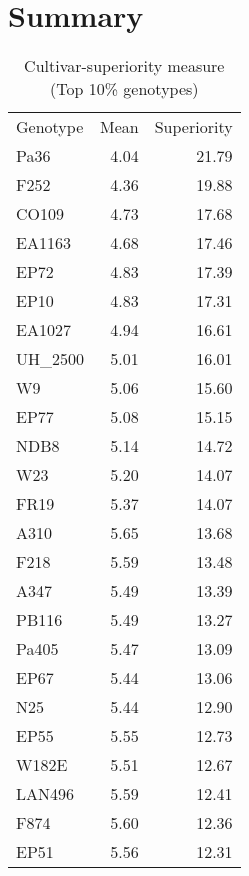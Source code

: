 \documentclass[a4paper,11pt]{article}\usepackage[]{graphicx}\usepackage[]{xcolor}
\begin{document}
\section{Summary}
\begin{table}[ht]
\begin{flushleft}
\caption{Cultivar-superiority measure (Top 10\% genotypes)} 
\label{cultSup}
\begin{tabular}{lrr}
 Genotype & Mean & Superiority \\ 
 Pa36 & 4.04 & 21.79 \\ 
  F252 & 4.36 & 19.88 \\ 
  CO109 & 4.73 & 17.68 \\ 
  EA1163 & 4.68 & 17.46 \\ 
  EP72 & 4.83 & 17.39 \\ 
  EP10 & 4.83 & 17.31 \\ 
  EA1027 & 4.94 & 16.61 \\ 
  UH\_2500 & 5.01 & 16.01 \\ 
  W9 & 5.06 & 15.60 \\ 
  EP77 & 5.08 & 15.15 \\ 
  NDB8 & 5.14 & 14.72 \\ 
  W23 & 5.20 & 14.07 \\ 
  FR19 & 5.37 & 14.07 \\ 
  A310 & 5.65 & 13.68 \\ 
  F218 & 5.59 & 13.48 \\ 
  A347 & 5.49 & 13.39 \\ 
  PB116 & 5.49 & 13.27 \\ 
  Pa405 & 5.47 & 13.09 \\ 
  EP67 & 5.44 & 13.06 \\ 
  N25 & 5.44 & 12.90 \\ 
  EP55 & 5.55 & 12.73 \\ 
  W182E & 5.51 & 12.67 \\ 
  LAN496 & 5.59 & 12.41 \\ 
  F874 & 5.60 & 12.36 \\ 
  EP51 & 5.56 & 12.31 \\ 
  \end{tabular}
\end{flushleft}
\end{table}
\end{document}
